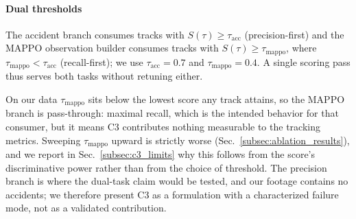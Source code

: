 \paragraph{Dual thresholds}
The accident branch consumes tracks with
$S(\tau) \geq \tau_{\mathrm{acc}}$ (precision-first) and the MAPPO
observation builder consumes tracks with
$S(\tau) \geq \tau_{\mathrm{mappo}}$, where
$\tau_{\mathrm{mappo}} < \tau_{\mathrm{acc}}$ (recall-first);
we use $\tau_{\mathrm{acc}} = 0.7$ and $\tau_{\mathrm{mappo}} = 0.4$.
A single scoring pass thus serves both tasks without retuning either.

On our data $\tau_{\mathrm{mappo}}$ sits below the lowest score any track
attains, so the MAPPO branch is pass-through: maximal recall, which is
the intended behavior for that consumer, but it means C3 contributes
nothing measurable to the tracking metrics.
Sweeping $\tau_{\mathrm{mappo}}$ upward is strictly worse
(Sec.~\ref{subsec:ablation_results}), and we report in
Sec.~\ref{subsec:c3_limits} why this follows from the score's
discriminative power rather than from the choice of threshold.
The precision branch is where the dual-task claim would be tested, and
our footage contains no accidents; we therefore present C3 as a
formulation with a characterized failure mode, not as a validated
contribution.
